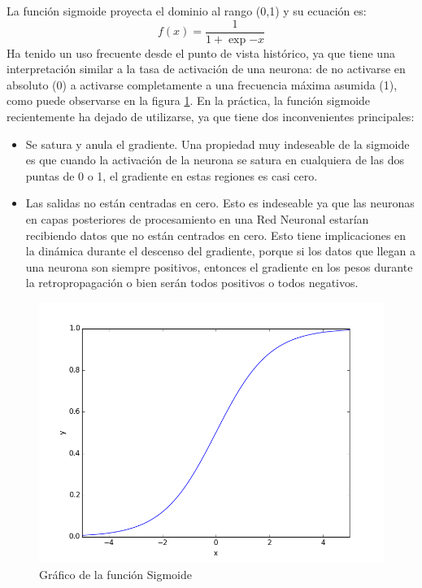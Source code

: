 \documentclass[a4paper,11pt,spanish]{book}
\begin{document}
	    La función sigmoide proyecta el dominio al rango (0,1) y su ecuación es:
	    \begin{equation*}
	     f(x) = \frac{1}{1+\exp{-x}}
	    \end{equation*}
	    Ha tenido un uso frecuente desde el punto de vista histórico, ya que tiene una interpretación similar a la tasa de activación de una neurona:
	    de no activarse en absoluto (0) a activarse completamente a una frecuencia máxima asumida (1), como puede observarse en la figura \ref{fig:sigmoid}. En la práctica, la función sigmoide recientemente ha dejado de utilizarse,
	    ya  que tiene dos inconvenientes principales:
	    \begin{itemize}
	     \item Se satura y anula el gradiente. Una propiedad muy indeseable de la sigmoide es que cuando la activación de la neurona se satura en cualquiera de las dos puntas de 0 o 1,
	      el gradiente en estas regiones es casi cero.
	     \item Las salidas no están centradas en cero. Esto es indeseable ya que las neuronas en capas posteriores de procesamiento en una Red Neuronal estarían recibiendo
	      datos que no están centrados en cero. Esto tiene implicaciones en la dinámica durante el descenso del gradiente, porque si los datos que llegan a una neurona
	      son siempre positivos, entonces el gradiente en los pesos durante la retropropagación o bien serán todos positivos o todos negativos.
	    \end{itemize}
	    \begin{figure}[H]
	      \begin{center}
	       \includegraphics[width=0.4\linewidth]{./img/sigmoid.png}
	      \end{center}
	      \caption{Gráfico de la función Sigmoide}
	      \label{fig:sigmoid}
	    \end{figure}
\end{document}
